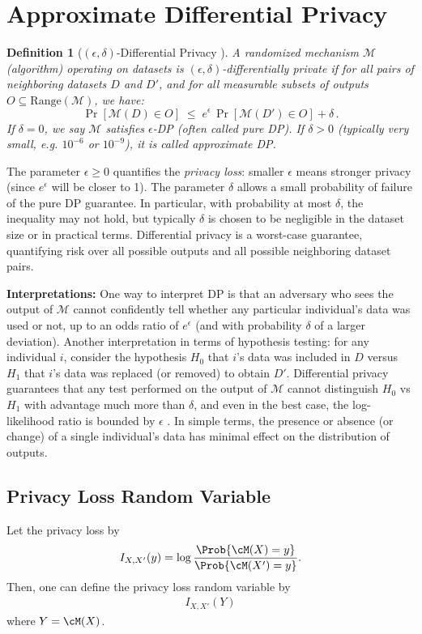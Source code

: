 \documentclass[11pt, a4paper]{article}
\newtheorem{definition}{Definition}
\begin{document}
\section{Approximate Differential Privacy}
\begin{definition}[$(\epsilon,\delta)$-Differential Privacy \cite{Dwork2006}] \label{def:app-dp}
A randomized mechanism $\mathcal{M}$ (algorithm) operating on datasets is $(\epsilon,\delta)$-differentially private if for all pairs of neighboring datasets $D$ and $D'$, and for all measurable subsets of outputs $O \subseteq \text{Range}(\mathcal{M})$, we have:
\[ 
\Pr[\mathcal{M}(D) \in O] \;\le\; e^{\epsilon} \,\Pr[\mathcal{M}(D') \in O] + \delta\,.
\] 
If $\delta=0$, we say $\mathcal{M}$ satisfies $\epsilon$-DP (often called \emph{pure} DP). If $\delta > 0$ (typically very small, e.g. $10^{-6}$ or $10^{-9}$), it is called \emph{approximate} DP.
\end{definition}

The parameter $\epsilon \ge 0$ quantifies the \textit{privacy loss}: smaller $\epsilon$ means stronger privacy (since $e^{\epsilon}$ will be closer to 1). The parameter $\delta$ allows a small probability of failure of the pure DP guarantee. In particular, with probability at most $\delta$, the inequality may not hold, but typically $\delta$ is chosen to be negligible in the dataset size or in practical terms. Differential privacy is a worst-case guarantee, quantifying risk over all possible outputs and all possible neighboring dataset pairs. 

\textbf{Interpretations:} One way to interpret DP is that an adversary who sees the output of $\mathcal{M}$ cannot confidently tell whether any particular individual’s data was used or not, up to an odds ratio of $e^{\epsilon}$ (and with probability $\delta$ of a larger deviation). Another interpretation in terms of hypothesis testing: for any individual $i$, consider the hypothesis $H_0$ that $i$'s data was included in $D$ versus $H_1$ that $i$'s data was replaced (or removed) to obtain $D'$. Differential privacy guarantees that any test performed on the output of $\mathcal{M}$ cannot distinguish $H_0$ vs $H_1$ with advantage much more than $\delta$, and even in the best case, the log-likelihood ratio is bounded by $\epsilon$ \cite{Wasserman2010}. In simple terms, the presence or absence (or change) of a single individual's data has minimal effect on the distribution of outputs.

\subsection{Privacy Loss Random Variable}
Let the privacy loss by
\begin{align}
    I_{X, X'} (y) = \log \frac{\Prob{\cM(X)=y}}{\Prob{\cM(X')=y}}.
\end{align}
Then, one can define the privacy loss random variable by
\begin{align}
    I_{X, X'}(Y) 
\end{align}
where $Y=\cM(X)$.
\end{document}
